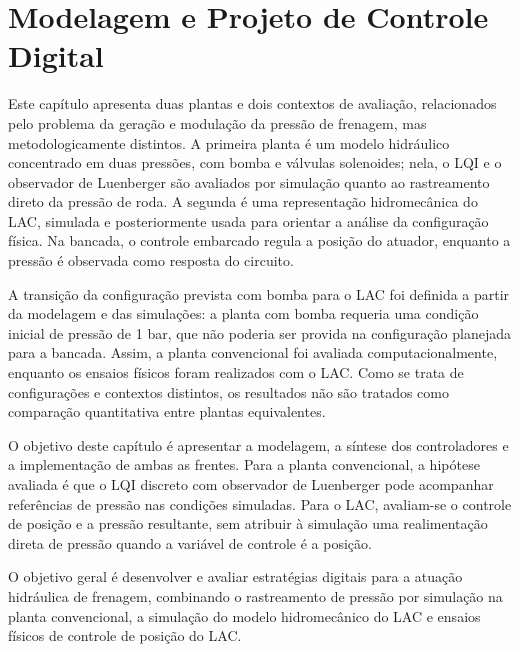 \chapter[Modelagem e Projeto de Controle Digital]{Modelagem e Projeto de Controle Digital}
\label{cap:controle}

Este capítulo apresenta duas plantas e dois contextos de avaliação, relacionados pelo problema da geração e modulação da pressão de frenagem, mas metodologicamente distintos. A primeira planta é um modelo hidráulico concentrado em duas pressões, com bomba e válvulas solenoides; nela, o LQI e o observador de Luenberger são avaliados por simulação quanto ao rastreamento direto da pressão de roda. A segunda é uma representação hidromecânica do LAC, simulada e posteriormente usada para orientar a análise da configuração física. Na bancada, o controle embarcado regula a posição do atuador, enquanto a pressão é observada como resposta do circuito.

A transição da configuração prevista com bomba para o LAC foi definida a partir da modelagem e das simulações: a planta com bomba requeria uma condição inicial de pressão de 1 bar, que não poderia ser provida na configuração planejada para a bancada. Assim, a planta convencional foi avaliada computacionalmente, enquanto os ensaios físicos foram realizados com o LAC. Como se trata de configurações e contextos distintos, os resultados não são tratados como comparação quantitativa entre plantas equivalentes.

O objetivo deste capítulo é apresentar a modelagem, a síntese dos controladores e a implementação de ambas as frentes. Para a planta convencional, a hipótese avaliada é que o LQI discreto com observador de Luenberger pode acompanhar referências de pressão nas condições simuladas. Para o LAC, avaliam-se o controle de posição e a pressão resultante, sem atribuir à simulação uma realimentação direta de pressão quando a variável de controle é a posição.

O objetivo geral é desenvolver e avaliar estratégias digitais para a atuação hidráulica de frenagem, combinando o rastreamento de pressão por simulação na planta convencional, a simulação do modelo hidromecânico do LAC e ensaios físicos de controle de posição do LAC.

